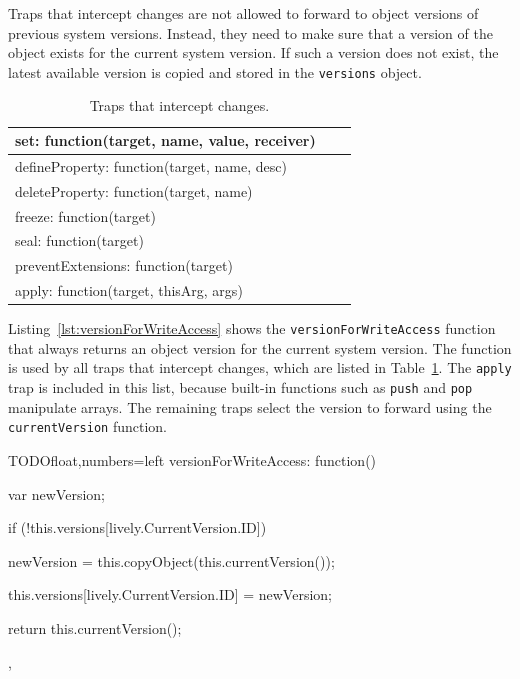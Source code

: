Traps that intercept changes are not allowed to forward to object versions of previous system versions.
Instead, they need to make sure that a version of the object exists for the current system version.
If such a version does not exist, the latest available version is copied and stored in the \lstinline{versions} object.

\begin{table}[h]
\begin{center}
\begin{tabular}{|l|l|r|}
\hline
set: function(target, name, value, receiver) \\ \hline
defineProperty: function(target, name, desc) \\ \hline
deleteProperty: function(target, name) \\ \hline
freeze: function(target) \\ \hline
seal: function(target) \\ \hline
preventExtensions: function(target) \\ \hline
apply: function(target, thisArg, args) \\ \hline
\end{tabular}
\caption[Table caption text]{Traps that intercept changes.}
\label{table:writeTraps}
\end{center}
\end{table}

Listing~\ref{lst:versionForWriteAccess} shows the \lstinline{versionForWriteAccess} function that always returns an object version for the current system version.
The function is used by all traps that intercept changes, which are listed in Table~\ref{table:writeTraps}.
The \lstinline{apply} trap is included in this list, because built-in functions such as \lstinline{push} and \lstinline{pop} manipulate arrays.
The remaining traps select the version to forward using the \lstinline{currentVersion} function.

\begin{code}{TODO}{float,numbers=left}
versionForWriteAccess: function() {
    var newVersion;
    
    if (!this.versions[lively.CurrentVersion.ID]) {
        newVersion = this.copyObject(this.currentVersion());
        
        this.versions[lively.CurrentVersion.ID] = newVersion;
    }
    
    return this.currentVersion();
},
\end{code}
\label{lst:versionForWriteAccess}
\iffalse
\end{verbatim}\fi

